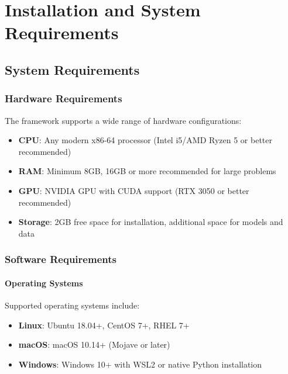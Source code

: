 \section{Installation and System Requirements}

\lstset{
    basicstyle=\ttfamily\footnotesize,
    breaklines=true,
    breakatwhitespace=true,
    columns=fullflexible,
    keepspaces=true,
    showstringspaces=false,
    frame=lines,
    xleftmargin=2em,
    xrightmargin=0em
}

\subsection{System Requirements}

\subsubsection{Hardware Requirements}
The framework supports a wide range of hardware configurations:
\begin{itemize}
    \item \textbf{CPU}: Any modern x86-64 processor (Intel i5/AMD Ryzen 5 or better recommended)
    \item \textbf{RAM}: Minimum 8GB, 16GB or more recommended for large problems
    \item \textbf{GPU}: NVIDIA GPU with CUDA support (RTX 3050 or better recommended)
    \item \textbf{Storage}: 2GB free space for installation, additional space for models and data
\end{itemize}

\subsubsection{Software Requirements}

\paragraph{Operating Systems}
Supported operating systems include:
\begin{itemize}
    \item \textbf{Linux}: Ubuntu 18.04+, CentOS 7+, RHEL 7+
    \item \textbf{macOS}: macOS 10.14+ (Mojave or later)
    \item \textbf{Windows}: Windows 10+ with WSL2 or native Python installation
\end{itemize}

